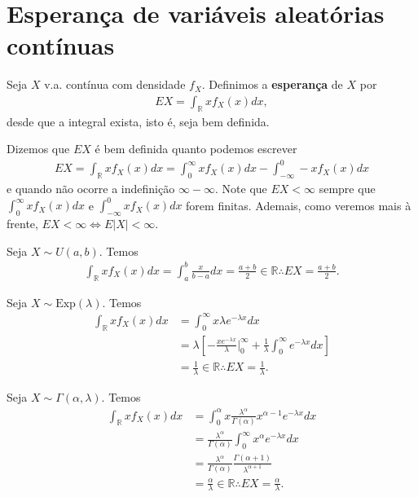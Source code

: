 \documentclass[../Notas.tex]{subfiles}
\begin{document}
\section{Esperança de variáveis aleatórias contínuas}
\begin{definition}
Seja $X$ v.a. contínua com densidade $f_X$. Definimos a \textbf{esperança} de $X$ por
\begin{align*}
    EX = \int_{\mathbb{R}} xf_X(x) dx,
\end{align*}
desde que a integral exista, isto é, seja bem definida.
\end{definition}
\begin{remark}
Dizemos que $EX$ é bem definida quanto podemos escrever
\begin{align*}
    EX = \int_{\mathbb{R}} xf_X(x) dx = \int_{0}^{\infty} xf_X(x) dx - \int_{-\infty}^0 -xf_X(x) dx
\end{align*}
e quando não ocorre a indefinição $\infty - \infty$. Note que $EX < \infty$ sempre que $\displaystyle{ \int_{0}^{\infty} xf_X(x) dx }$ e $\displaystyle{ \int_{-\infty}^{0} xf_X(x) dx }$ forem finitas. Ademais, como veremos mais à frente, $EX < \infty \iff E|X| < \infty$.
\end{remark}

\begin{example}
Seja $X\sim U(a,b)$. Temos
\begin{align*}
    \int_{\mathbb{R}} xf_X(x) dx = \int_a^b \frac{x}{b-a} dx = \frac{a+b}{2}\in\mathbb{R} \therefore EX = \frac{a+b}{2}.
\end{align*}
\end{example}

\begin{example}
Seja $X\sim\text{Exp}(\lambda)$. Temos
\begin{align*}
    \int_{\mathbb{R}} xf_X(x) dx &= \int_{0}^{\infty} x\lambda e^{-\lambda x} dx \\
    &= \lambda\left[ -\frac{xe^{-\lambda x}}{\lambda}\Big|_0^{\infty} + \frac{1}{\lambda}\int_{0}^{\infty} e^{-\lambda x}dx \right] \\
    &= \frac{1}{\lambda}\in\mathbb{R}\therefore EX = \frac{1}{\lambda}.
\end{align*}
\end{example}

\begin{example}
Seja $X\sim\Gamma(\alpha, \lambda)$. Temos
\begin{align*}
    \int_{\mathbb{R}} xf_X(x) dx &= \int_{0}^{\alpha} x\frac{\lambda^{\alpha}}{\Gamma(\alpha)}x^{\alpha - 1}e^{-\lambda x} dx \\
    &= \frac{\lambda^{\alpha}}{\Gamma(\alpha)}\int_{0}^{\infty} x^{\alpha}e^{-\lambda x} dx \\
    &= \frac{\lambda^{\alpha}}{\Gamma(\alpha)}\frac{\Gamma(\alpha + 1)}{\lambda^{\alpha + 1}} \\
    &= \frac{\alpha}{\lambda} \in\mathbb{R} \therefore EX = \frac{\alpha}{\lambda}.
\end{align*}
\end{example}
\end{document}
